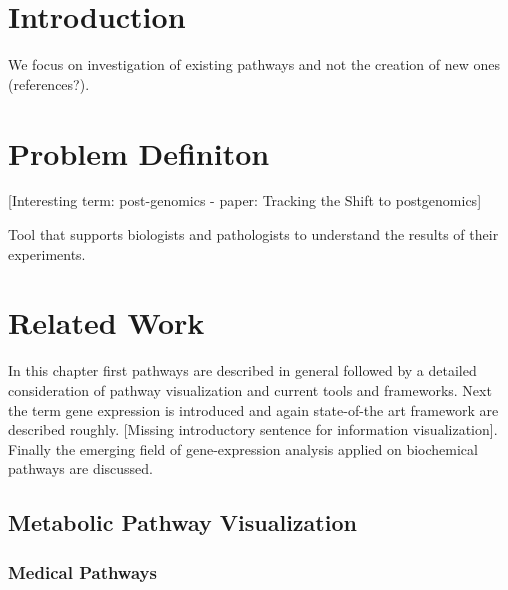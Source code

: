 \chapter{Introduction}

We focus on investigation of existing pathways and not the creation of new ones (references?).

\chapter{Problem Definiton}

[Interesting term: post-genomics - paper: Tracking the Shift to postgenomics]

Tool that supports biologists and pathologists to understand the results of their experiments.


\chapter{Related Work}

In this chapter first pathways are described in general followed by a detailed consideration of pathway visualization and current tools and frameworks. Next the term gene expression is introduced and again state-of-the art framework are described roughly. [Missing introductory sentence for information visualization]. Finally the emerging field of gene-expression analysis applied on biochemical pathways are discussed.

\section{Metabolic Pathway Visualization}

\subsection{Medical Pathways}

